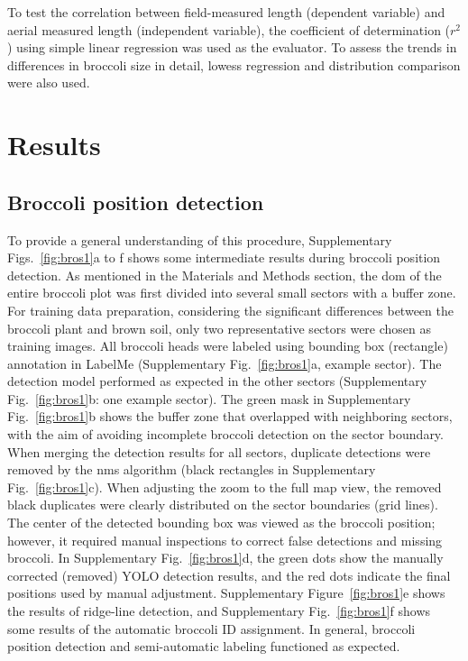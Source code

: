 To test the correlation between field-measured length (dependent variable) and aerial measured length (independent variable), the coefficient of determination ($r^2$) using simple linear regression was used as the evaluator. To assess the trends in differences in broccoli size in detail, \gls{lowess} regression and distribution comparison were also used.

\section{Results}

\subsection{Broccoli position detection}

To provide a general understanding of this procedure, Supplementary Figs.~\ref{fig:bros1}a to f shows some intermediate results during broccoli position detection. As mentioned in the Materials and Methods section, the \gls{dom} of the entire broccoli plot was first divided into several small sectors with a buffer zone. For training data preparation, considering the significant differences between the broccoli plant and brown soil, only two representative sectors were chosen as training images. All broccoli heads were labeled using bounding box (rectangle) annotation in LabelMe (Supplementary Fig.~\ref{fig:bros1}a, example sector). The detection model performed as expected in the other sectors (Supplementary Fig.~\ref{fig:bros1}b: one example sector). The green mask in Supplementary Fig.~\ref{fig:bros1}b shows the buffer zone that overlapped with neighboring sectors, with the aim of avoiding incomplete broccoli detection on the sector boundary. When merging the detection results for all sectors, duplicate detections were removed by the \gls{nms} algorithm (black rectangles in Supplementary Fig.~\ref{fig:bros1}c). When adjusting the zoom to the full map view, the removed black duplicates were clearly distributed on the sector boundaries (grid lines). The center of the detected bounding box was viewed as the broccoli position; however, it required manual inspections to correct false detections and missing broccoli. In Supplementary Fig.~\ref{fig:bros1}d, the green dots show the manually corrected (removed) YOLO detection results, and the red dots indicate the final positions used by manual adjustment. Supplementary Figure~\ref{fig:bros1}e shows the results of ridge-line detection, and Supplementary Fig.~\ref{fig:bros1}f shows some results of the automatic broccoli ID assignment. In general, broccoli position detection and semi-automatic labeling functioned as expected.

